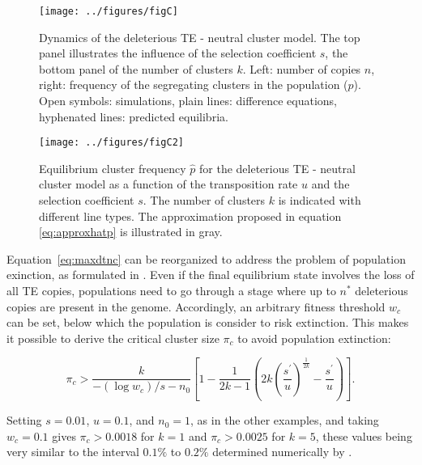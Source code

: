 \documentclass[10pt,a4paper]{article}
\begin{document}
\begin{figure}[h]
\begin{adjustwidth}{-1in}{0in}
\begin{flushright}
	\texttt{[image: ../figures/figC]}
\caption{\label{fig:figC} Dynamics of the deleterious TE - neutral cluster model. The top panel illustrates the influence of the selection coefficient $s$, the bottom panel of the number of clusters $k$. Left: number of copies $n$, right: frequency of the segregating clusters in the population ($p$). Open symbols: simulations, plain lines: difference equations, hyphenated lines: predicted equilibria. }
\end{flushright}\end{adjustwidth}
\end{figure}

\begin{figure}[h]
\begin{adjustwidth}{-1in}{0in}
\begin{flushright}
	\texttt{[image: ../figures/figC2]}
\caption{\label{fig:figC2} Equilibrium cluster frequency $\hat p$ for the deleterious TE - neutral cluster model as a function of the transposition rate $u$ and the selection coefficient $s$. The number of clusters $k$ is indicated with different line types. The approximation proposed in equation \ref{eq:approxhatp} is illustrated in gray. }
\end{flushright}\end{adjustwidth}
\end{figure}

Equation~\ref{eq:maxdtnc} can be reorganized to address the problem of population exinction, as formulated in \citet{Kof20}. Even if the final equilibrium state involves the loss of all TE copies, populations need to go through a stage where up to $n^\ast$ deleterious copies are present in the genome. Accordingly, an arbitrary fitness threshold $w_c$ can be set, below which the population is consider to risk extinction.  This makes it possible to derive the critical cluster size $\pi_c$ to avoid population extinction:

\begin{equation} \label{eq:critsize}
\pi_c > \frac{k}{-(\log w_c)/s - n_0} \left[ 1- \frac{1}{2k-1} \left( 2k \left( \frac{s^\prime}{u} \right)^\frac{1}{2k} - \frac{s^\prime}{u} \right) \right]. 
\end{equation}

Setting $s=0.01$, $u=0.1$, and $n_0 = 1$, as in the other examples, and taking $w_c = 0.1$ gives $\pi_c > 0.0018$ for $k=1$ and $\pi_c > 0.0025$ for $k=5$, these values being very similar to the interval $0.1\%$ to $0.2\%$ determined numerically by \citet{Kof20}. 
\end{document}
